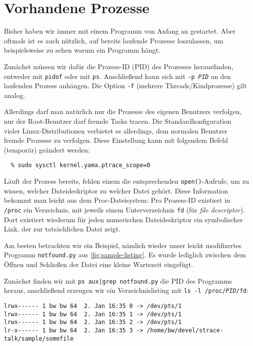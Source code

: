 \section{Vorhandene Prozesse}

Bisher haben wir \strace{} immer mit einem Programm von Anfang an gestartet. Aber oftmals
ist es auch nützlich, \strace{} auf bereits laufende Prozesse loszulassen, um beispielsweise zu
sehen warum ein Programm hängt.

Zunächst müssen wir dafür die Prozess-ID (PID) des Prozesses herausfinden, entweder mit
\texttt{pidof} oder mit \texttt{ps}. Anschließend kann sich \strace{} mit \texttt{-p \emph{PID}}
an den laufenden Prozess anhängen. Die Option \texttt{-f} (mehrere Threads/Kindprozesse) gilt
analog.


Allerdings darf man natürlich nur die Prozesse des eigenen Benutzers verfolgen, nur der
Root-Benutzer darf fremde Tasks tracen. Die Standardkonfiguration vieler Linux-Distributionen
verbietet es allerdings, dem normalen Benutzer fremde Prozesse zu verfolgen. Diese Einstellung
kann mit folgendem Befehl (temporär) geändert werden:

\begin{verbatim}
  % sudo sysctl kernel.yama.ptrace_scope=0
\end{verbatim}





Läuft der Prozess bereits, fehlen einem die entsprechenden \texttt{open()}-Aufrufe, um zu wissen,
welcher Dateideskriptor zu welcher Datei gehört. Diese Information bekommt man leicht aus dem
Proc-Dateisystem: Pro Prozess-ID existiert in \texttt{/proc} ein Verzeichnis, mit jeweils einem
Unterverzeichnis \texttt{fd} (für \emph{file descriptor}). Dort existiert wiederum für jeden
numerischen Dateideskriptor ein symbolischer Link, der zur tatsächlichen Datei zeigt.

Am besten betrachten wir ein Beispiel, nämlich wieder unser leicht modifizertes Programm
\texttt{notfound.py} aus \autoref{fig:sample-listing}. Es wurde lediglich zwischen dem Öffnen
und Schließen der Datei eine kleine Wartezeit eingefügt.

Zunächst finden wir mit \texttt{ps aux|grep notfound.py} die PID des Programms heraus, anschließend
erzeugen wir ein Verzeichnislisting mit \texttt{ls -l /proc/\emph{PID}/fd}:

\begin{lstlisting}
lrwx------ 1 bw bw 64  2. Jan 16:35 0 -> /dev/pts/1
lrwx------ 1 bw bw 64  2. Jan 16:35 1 -> /dev/pts/1
lrwx------ 1 bw bw 64  2. Jan 16:35 2 -> /dev/pts/1
lr-x------ 1 bw bw 64  2. Jan 16:35 3 -> /home/bw/devel/strace-talk/sample/somefile
\end{lstlisting}

